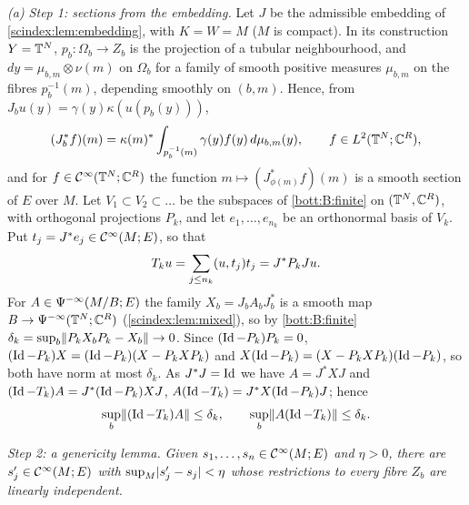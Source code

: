 \emph{(a) Step 1: sections from the embedding.} Let $J$ be the admissible embedding
of \cref{scindex:lem:embedding}, with $K=W=M$ ($M$ is compact). In its
construction $Y=\mathbb{T}^N$, $p_b:\Omega_b\to Z_b$ is the projection of a tubular
neighbourhood, and $dy=\mu_{b,m}\otimes\nu(m)$ on $\Omega_b$ for a family of smooth
positive measures $\mu_{b,m}$ on the fibres $p_b^{-1}(m)$, depending smoothly on
$(b,m)$. Hence, from $J_bu(y)=\gamma(y)\kappa(u(p_b(y)))$,
\begin{equation*}
  (J_b^*f)(m)=\kappa(m)^*\int_{p_b^{-1}(m)}\gamma(y)f(y)\,d\mu_{b,m}(y),
  \qquad f\in L^2(\mathbb{T}^N;\mathbb{C}^R),
\end{equation*}
and for $f\in\mathcal{C}^\infty(\mathbb{T}^N;\mathbb{C}^R)$ the function $m\mapsto(J^*_{\phi(m)}f)(m)$ is a
smooth section of $E$ over $M$. Let $V_1\subset V_2\subset\dots$ be the subspaces of
\ref{bott:B:finite} on $(\mathbb{T}^N,\mathbb{C}^R)$, with orthogonal projections $P_k$, and
let $e_1,\dots,e_{n_k}$ be an orthonormal basis of $V_k$. Put
$t_j=J^*e_j\in\mathcal{C}^\infty(M;E)$, so that
\begin{equation*}
  T_ku=\sum_{j\le n_k}( u, t_j)t_j=J^*P_kJu.
\end{equation*}
For $A\in\Psi^{-\infty}(M/B;E)$ the family $X_b=J_bA_bJ_b^*$ is a smooth map
$B\to\Psi^{-\infty}(\mathbb{T}^N;\mathbb{C}^R)$ (\cref{scindex:lem:mixed}), so by \ref{bott:B:finite}
$\delta_k=\sup_b\lVert P_kX_bP_k-X_b\rVert\to0$. Since $(\operatorname{Id}-P_k)P_k=0$,
$(\operatorname{Id}-P_k)X=(\operatorname{Id}-P_k)(X-P_kXP_k)$ and $X(\operatorname{Id}-P_k)=(X-P_kXP_k)(\operatorname{Id}-P_k)$, so both
have norm at most $\delta_k$. As $J^*J=\operatorname{Id}$ we have $A=J^*XJ$ and
$(\operatorname{Id}-T_k)A=J^*(\operatorname{Id}-P_k)XJ$, $A(\operatorname{Id}-T_k)=J^*X(\operatorname{Id}-P_k)J$; hence
\begin{equation}\label{solsemiclassical-index:eq:Tk}
  \sup_b\lVert (\operatorname{Id}-T_k)A\rVert\le\delta_k,\qquad\sup_b\lVert A(\operatorname{Id}-T_k)\rVert\le\delta_k .
\end{equation}

\emph{Step 2: a genericity lemma.} \textit{Given $s_1,\dots,s_n\in\mathcal{C}^\infty(M;E)$ and
$\eta>0$, there are $s'_j\in\mathcal{C}^\infty(M;E)$ with $\sup_M\lvert s'_j-s_j\rvert<\eta$ whose
restrictions to every fibre $Z_b$ are linearly independent.}

